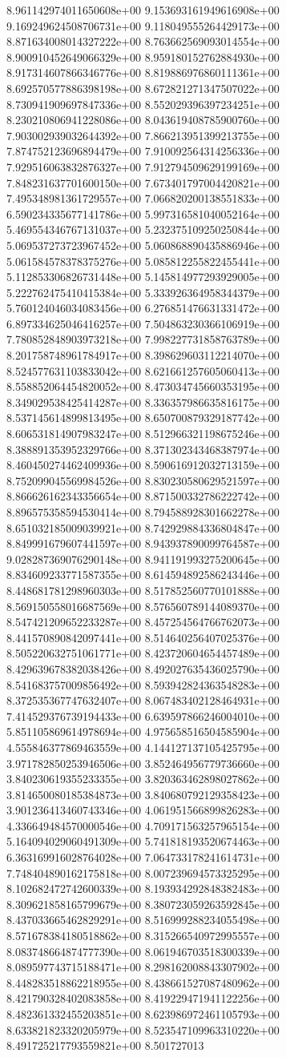 8.961142974011650608e+00	9.153693161949616908e+00	9.169249624508706731e+00	9.118049555264429173e+00	8.871634008014327222e+00	8.763662569093014554e+00	8.900910452649066329e+00	8.959180152762884930e+00	8.917314607866346776e+00	8.819886976860111361e+00	8.692570577886398198e+00	8.672821271347507022e+00	8.730941909697847336e+00	8.552029396397234251e+00	8.230210806941228086e+00	8.043619408785900760e+00	7.903002939032644392e+00	7.866213951399213755e+00	7.874752123696894479e+00	7.910092564314256336e+00	7.929516063832876327e+00	7.912794509629199169e+00	7.848231637701600150e+00	7.673401797004420821e+00	7.495348981361729557e+00	7.066820200138551833e+00	6.590234335677141786e+00	5.997316581040052164e+00	5.469554346767131037e+00	5.232375109250250844e+00	5.069537273723967452e+00	5.060868890435886946e+00	5.061584578378375276e+00	5.085812255822455441e+00	5.112853306826731448e+00	5.145814977293929005e+00	5.222762475410415384e+00	5.333926364958344379e+00	5.760124046034083456e+00	6.276851476631331472e+00	6.897334625046416257e+00	7.504863230366106919e+00	7.780852848903973218e+00	7.998227731858763789e+00	8.201758748961784917e+00	8.398629603112214070e+00	8.524577631103833042e+00	8.621661257605060413e+00	8.558852064454820052e+00	8.473034745660353195e+00	8.349029538425414287e+00	8.336357986635816175e+00	8.537145614899813495e+00	8.650700879329187742e+00	8.606531814907983247e+00	8.512966321198675246e+00	8.388891353952329766e+00	8.371302343468387974e+00	8.460450274462409936e+00	8.590616912032713159e+00	8.752099045569984526e+00	8.830230580629521597e+00	8.866626162343356654e+00	8.871500332786222742e+00	8.896575358594530414e+00	8.794588928301662278e+00	8.651032185009039921e+00	8.742929884336804847e+00	8.849991679607441597e+00	8.943937890099764587e+00	9.028287369076290148e+00	8.941191993275200645e+00	8.834609233771587355e+00	8.614594892586243446e+00	8.448681781298960303e+00	8.517852560770101888e+00	8.569150558016687569e+00	8.576560789144089370e+00	8.547421209652233287e+00	8.457254564766762073e+00	8.441570890842097441e+00	8.514640256407025376e+00	8.505220632751061771e+00	8.423720604654457489e+00	8.429639678382038426e+00	8.492027635436025790e+00	8.541683757009856492e+00	8.593942824363548283e+00	8.372535367747632407e+00	8.067483402128464931e+00	7.414529376739194433e+00	6.639597866246004010e+00	5.851105869614978694e+00	4.975658516504585904e+00	4.555846377869463559e+00	4.144127137105425795e+00	3.971782850253946506e+00	3.852464956779736660e+00	3.840230619355233355e+00	3.820363462898027862e+00	3.814650080185384873e+00	3.840680792129358423e+00	3.901236413460743346e+00	4.061951566899826283e+00	4.336649484570000546e+00	4.709171563257965154e+00	5.164094029060491309e+00	5.741818193520674463e+00	6.363169916028764028e+00	7.064733178241614731e+00	7.748404890162175818e+00	8.007239694573325295e+00	8.102682472742600339e+00	8.193934292848382483e+00	8.309621858165799679e+00	8.380723059263592845e+00	8.437033665462829291e+00	8.516999288234055498e+00	8.571678384180518862e+00	8.315266540972995557e+00	8.083748664874777390e+00	8.061946703518300339e+00	8.089597743715188471e+00	8.298162008843307902e+00	8.448283518862218955e+00	8.438661527087480962e+00	8.421790328402083858e+00	8.419229471941122256e+00	8.482361332455203851e+00	8.623986972461105793e+00	8.633821823320205979e+00	8.523547109963310220e+00	8.491725217793559821e+00	8.501727013